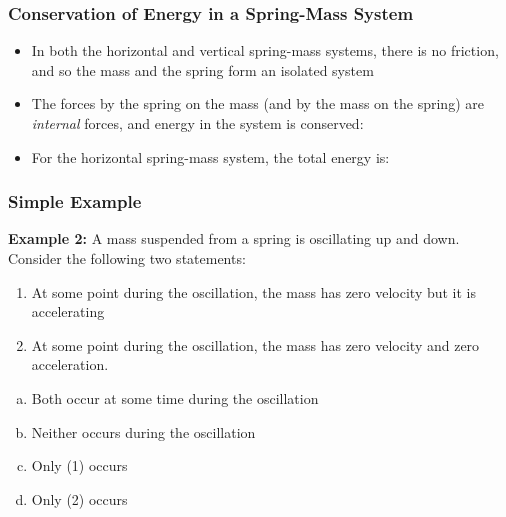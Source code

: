 \documentclass[12pt,compress,aspectratio=169]{beamer}
\begin{document}
\begin{frame}
  \frametitle{Conservation of Energy in a Spring-Mass System}
  \begin{itemize}
  \item In both the horizontal and vertical spring-mass systems, there is no
    friction, and so the mass and the spring form an isolated system
  \item The forces by the spring on the mass (and by the mass on the spring)
    are \emph{internal} forces, and energy in the system is conserved:

  \item For the horizontal spring-mass system, the total energy is:
    
  \end{itemize}
\end{frame}




\begin{frame}
  \frametitle{Simple Example}
  \textbf{Example 2:} A mass suspended from a spring is oscillating up and
  down. Consider the following two statements:
  \begin{enumerate}
  \item At some point during the oscillation, the mass has zero velocity but it
    is accelerating
  \item At some point during the oscillation, the mass has zero velocity and
    zero acceleration.
  \end{enumerate}

  \begin{enumerate}[(a)]
  \item Both occur at some time during the oscillation
  \item Neither occurs during the oscillation
  \item Only (1) occurs
  \item Only (2) occurs
  \end{enumerate}
\end{frame}
\end{document}
